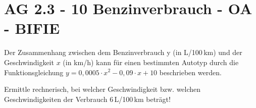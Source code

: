 \section{AG 2.3 - 10 Benzinverbrauch  - OA - BIFIE}

\begin{beispiel}[AG 2.3]{1} %
Der Zusammenhang zwischen dem Benzinverbrauch y (in L/100\,km) und der Geschwindigkeit $x$ (in km/h) kann für einen bestimmten Autotyp durch die Funktionsgleichung
$y = 0,0005 \cdot x^2- 0,09 \cdot x + 10$ beschrieben werden. 
\leer

Ermittle rechnerisch, bei welcher Geschwindigkeit bzw. welchen Geschwindigkeiten der Verbrauch 6\,L/100\,km beträgt!

\end{beispiel}